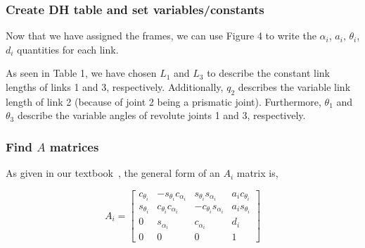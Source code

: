 \documentclass[conference]{IEEEtran}
\begin{document}
\subsubsection{Create DH table and set variables/constants}
Now that we have assigned the frames, we can use Figure 4 to write
the $\alpha_i$, $a_i$, $\theta_i$, $d_i$ quantities for each link.

\begin{table}[h!]
    \begin{center}
    \end{center}
    \caption{Denavit-Hartenberg table for Problem 3--5}
\end{table}

As seen in Table 1, we have chosen $L_1$ and $L_3$ to describe the constant link
lengths of links 1 and 3, respectively. Additionally, $q_2$ describes the variable
link length of link 2 (because of joint 2 being a prismatic joint).
Furthermore, $\theta_1$ and $\theta_3$ describe the
variable angles of revolute joints 1 and 3, respectively.

\subsubsection{Find $A$ matrices}

As given in our textbook~\cite{Spong2006}, the general form of an
$A_i$ matrix is,

\[
    A_i =
    \begin{bmatrix}
        c_{\theta_i} & -s_{\theta_i}c_{\alpha_i} & s_{\theta_i}s_{\alpha_i} & a_i c_{\theta_i}\\
        s_{\theta_i} & c_{\theta_i}c_{\alpha_i} & -c_{\theta_i}s_{\alpha_i} & a_i s_{\theta_i}\\
        0 & s_{\alpha_i} & c_{\alpha_i} & d_i\\
        0 & 0 & 0 & 1
    \end{bmatrix}
\]
\end{document}
